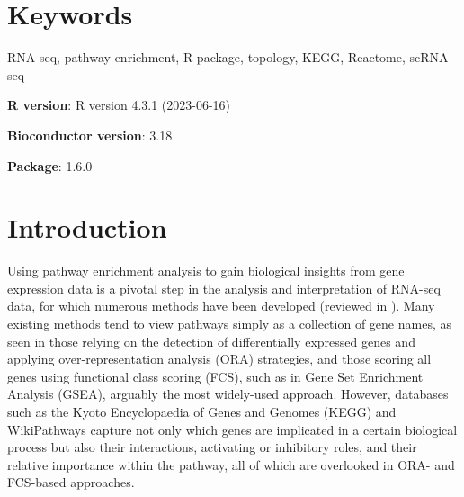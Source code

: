 \documentclass[9pt,a4paper,]{extarticle}
\begin{document}
\section*{Keywords}
RNA-seq, pathway enrichment, R package, topology, KEGG, Reactome, scRNA-seq


\clearpage
\pagestyle{main}

\textbf{R version}: R version 4.3.1 (2023-06-16)

\textbf{Bioconductor version}: 3.18

\textbf{Package}: 1.6.0

\hypertarget{introduction}{%
\section{Introduction}\label{introduction}}

Using pathway enrichment analysis to gain biological insights from gene expression data is a pivotal step in the analysis and interpretation of RNA-seq data, for which numerous methods have been developed (reviewed in \citep{Maleki2020-ur, Mubeen2022-eq}).
Many existing methods tend to view pathways simply as a collection of gene names, as seen in those relying on the detection of differentially expressed genes and applying over-representation analysis (ORA) strategies, and those scoring all genes using functional class scoring (FCS), such as in Gene Set Enrichment Analysis (GSEA)\citep{Subramanian2005-lx}, arguably the most widely-used approach.
However, databases such as the Kyoto Encyclopaedia of Genes and Genomes (KEGG)\citep{OgataKEGGKyotoEncyclopediaa} and WikiPathways\citep{Martens2021} capture not only which genes are implicated in a certain biological process but also their interactions, activating or inhibitory roles, and their relative importance within the pathway, all of which are overlooked in ORA- and FCS-based approaches.
\end{document}
